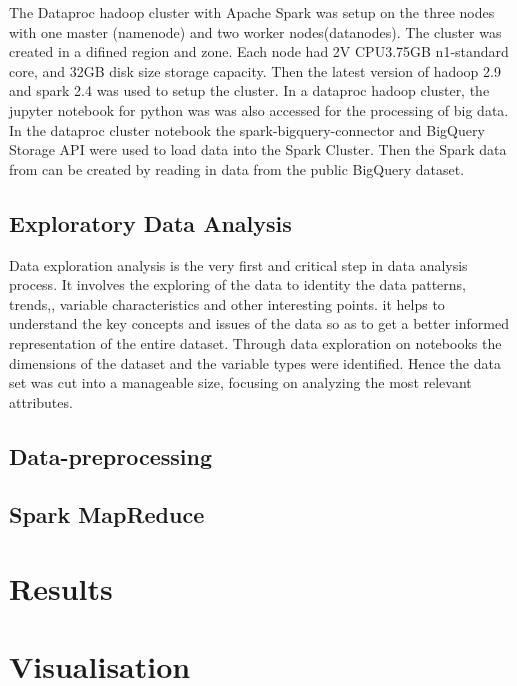 \documentclass[12pt,letterpaper, twoside]{article}
\begin{document}
The Dataproc hadoop cluster with Apache Spark was setup on the three nodes with one master (namenode) and two worker nodes(datanodes). The cluster was created in a difined region and zone. Each node had 2V CPU3.75GB n1-standard core, and 32GB disk size storage capacity. Then the latest version of hadoop 2.9 and spark 2.4 was used to setup the cluster. In a dataproc hadoop cluster, the jupyter notebook for python was was also accessed for the processing of big data.  In the dataproc cluster notebook the spark-bigquery-connector and BigQuery Storage API were used to  load data into the Spark Cluster. Then the Spark data from can be created by reading in data from the public BigQuery dataset. 

\subsection{ Exploratory Data Analysis}
Data exploration analysis is the very first and critical step in data analysis process. It involves the exploring of the data to identity the data patterns, trends,, variable characteristics and other interesting points. it helps to understand the key concepts and issues of the data so as to get a better informed representation of the entire dataset. Through data exploration on notebooks the dimensions of the dataset and the variable types were identified. Hence the data set was cut into a manageable size, focusing on analyzing the most relevant attributes.  

\subsection{Data-preprocessing}


\subsection{ Spark MapReduce}

\section{Results}
\section{Visualisation}
\end{document}
